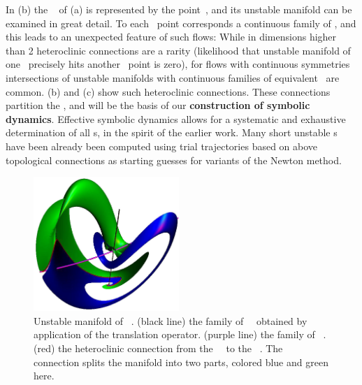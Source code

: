 In (b) the \eqv~ of
(a) is represented by the point~,
and its unstable manifold can be examined in great detail.
To each \eqv\ point corresponds a continuous family
of \eqva, and this leads to an unexpected feature of such
flows: While in dimensions higher than 2 heteroclinic connections 
are a rarity (likelihood that unstable manifold of one
 \eqv\ precisely hits another \eqv\ point is zero), 
for flows with continuous symmetries intersections of unstable
manifolds with continuous families of equivalent \eqva\ are common.
(b) and (c) show 
such heteroclinic connections.
These connections partition the \statesp,
and will be the basis of our
{\bf construction of symbolic dynamics}.
Effective symbolic dynamics allows
for a systematic and exhaustive determination 
of all \rpo s, in the spirit of 
the earlier work. 
Many short unstable \rpo s have been already 
been computed using trial trajectories based on above
topological connections as starting  guesses 
for variants of the Newton method.


\begin{figure}[t]
\begin{center} 
\includegraphics[height=2in]{figs/ks22manifold1.eps}
\end{center}
\caption{
    Unstable manifold of ~\eqv.
    (black line) the family of ~\eqva\ 
obtained by application of the translation operator. 
(purple line) the family of ~\eqva.
(red) the heteroclinic connection 
from the ~\eqv\ to the ~\eqv.
The connection splits the manifold into two parts, 
colored blue and green here.
        }
\label{f:KS22Manifold}\vspace*{-5pt}
\end{figure}


